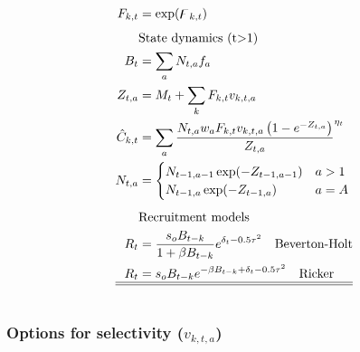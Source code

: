 \begin{multicols}{2}
\begin{tablehere}
\begin{align}
        F_{k,t}&=\exp(\digamma_{k,t}) \label{T4.7}\\[1ex]
        &\mbox{State dynamics (t$>$1)} \nonumber\\
        B_t&=\sum_a N_{t,a}f_a \label{T4.8}\\
        Z_{t,a}&=M_t+\sum_k F_{k,t} v_{k,t,a}\label{T4.9}\\
        \hat{C}_{k,t}&=\sum _ a\frac {N_{{t,a}}w_{{a}}F_{k,t} v_{{k,t,a}}
        \left( 1-{e^{-Z_{t,a}}} \right) }{Z_{t,a}}^{\eta_t} \label{T4.10}\\
        N_{t,a}&=\begin{cases}
            N_{t-1,a-1} \exp(-Z_{t-1,a-1}) &a>1\\
            N_{t-1,a} \exp(-Z_{t-1,a}) & a=A
        \end{cases}\label{T4.11}\\[1ex]
        &\mbox{Recruitment models} \nonumber\\
        R_t &= \frac{s_oB_{t-k}}{1+\beta B_{t-k}}e^{\delta_{t}-0.5\tau^2} \quad \mbox{Beverton-Holt} \label{T4.12}\\
        R_t &= s_oB_{t-k}e^{-\beta B_{t-k}+\delta_t-0.5\tau^2} \quad \mbox{Ricker} \label{T4.13}\\
        \hline \hline \nonumber
    \end{align}

    \normalEq
\end{tablehere}





\subsubsection{Options for selectivity ($v_{k,t,a}$)} \label{ModelDocSelectivity}


\end{multicols}
